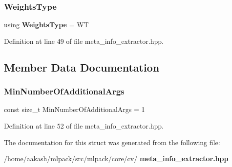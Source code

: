 \subsubsection{Weights\+Type}
{\footnotesize\ttfamily using \textbf{ Weights\+Type} =  WT}



Definition at line 49 of file meta\+\_\+info\+\_\+extractor.\+hpp.



\subsection{Member Data Documentation}
\mbox{\label{structmlpack_1_1cv_1_1TrainFormBase4_adacbdda6f41a542559105d6e48d1cfc2}} 
\subsubsection{Min\+Number\+Of\+Additional\+Args}
{\footnotesize\ttfamily const size\+\_\+t Min\+Number\+Of\+Additional\+Args = 1\hspace{0.3cm}{\ttfamily [static]}}



Definition at line 52 of file meta\+\_\+info\+\_\+extractor.\+hpp.



The documentation for this struct was generated from the following file\+:\begin{DoxyCompactItemize}
\item 
/home/aakash/mlpack/src/mlpack/core/cv/\textbf{ meta\+\_\+info\+\_\+extractor.\+hpp}\end{DoxyCompactItemize}
